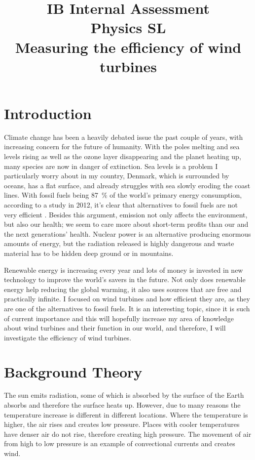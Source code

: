 \documentclass[12pt]{article}
\title{\textbf{IB Internal Assessment}\\\textbf{Physics SL}\\ Measuring the efficiency of wind turbines}
\begin{document}
\maketitle

\section{Introduction} 

Climate change has been a heavily debated issue the past couple of years, with increasing concern for the future of humanity.
With the poles melting and sea levels rising as well as the ozone layer disappearing and the planet heating up, many species are now in danger of extinction.
Sea levels is a problem I particularly worry about in my country, Denmark, which is surrounded by oceans, has a flat surface, and already struggles with sea slowly eroding the coast lines.
With fossil fuels being \SI{87}{\percent} of the world's primary energy consumption, according to a study in 2012, it's clear that alternatives to fossil fuels are not very efficient \cite{FossilFuels}.
Besides this argument,  emission not only affects the environment, but also our health; we seem to care more about short-term profits than our and the next generations' health.
Nuclear power is an alternative producing enormous amounts of energy, but the radiation released is highly dangerous and waste material has to be hidden deep ground or in mountains.

Renewable energy is increasing every year and lots of money is invested in new technology to improve the world's savers in the future.
Not only does renewable energy help reducing the global warming, it also uses sources that are free and practically infinite.
I focused on wind turbines and how efficient they are, as they are one of the alternatives to fossil fuels.
It is an interesting topic, since it is such of current importance and this will hopefully increase my area of knowledge about wind turbines and their function in our world, and therefore, I will investigate the efficiency of wind turbines.


\section{Background Theory}

The sun emits radiation, some of which is absorbed by the surface of the Earth absorbs and therefore the surface heats up.
However, due to many reasons the temperature increase is different in different locations.
Where the temperature is higher, the air rises and creates low pressure.
Places with cooler temperatures have denser air do not rise, therefore creating high pressure.
The movement of air from high to low pressure is an example of convectional currents and creates wind.
\end{document}
